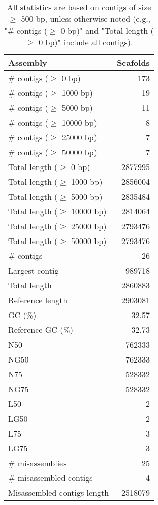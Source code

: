 \documentclass[12pt,a4paper]{article}
\begin{document}
\begin{table}[ht]
\begin{center}
\caption{All statistics are based on contigs of size $\geq$ 500 bp, unless otherwise noted (e.g., "\# contigs ($\geq$ 0 bp)" and "Total length ($\geq$ 0 bp)" include all contigs).}
\begin{tabular}{|l*{1}{|r}|}
\hline
Assembly & Scafolds \\ \hline
\# contigs ($\geq$ 0 bp) & 173 \\ \hline
\# contigs ($\geq$ 1000 bp) & 19 \\ \hline
\# contigs ($\geq$ 5000 bp) & 11 \\ \hline
\# contigs ($\geq$ 10000 bp) & 8 \\ \hline
\# contigs ($\geq$ 25000 bp) & 7 \\ \hline
\# contigs ($\geq$ 50000 bp) & 7 \\ \hline
Total length ($\geq$ 0 bp) & 2877995 \\ \hline
Total length ($\geq$ 1000 bp) & 2856004 \\ \hline
Total length ($\geq$ 5000 bp) & 2835484 \\ \hline
Total length ($\geq$ 10000 bp) & 2814064 \\ \hline
Total length ($\geq$ 25000 bp) & 2793476 \\ \hline
Total length ($\geq$ 50000 bp) & 2793476 \\ \hline
\# contigs & 26 \\ \hline
Largest contig & 989718 \\ \hline
Total length & 2860883 \\ \hline
Reference length & 2903081 \\ \hline
GC (\%) & 32.57 \\ \hline
Reference GC (\%) & 32.73 \\ \hline
N50 & 762333 \\ \hline
NG50 & 762333 \\ \hline
N75 & 528332 \\ \hline
NG75 & 528332 \\ \hline
L50 & 2 \\ \hline
LG50 & 2 \\ \hline
L75 & 3 \\ \hline
LG75 & 3 \\ \hline
\# misassemblies & 25 \\ \hline
\# misassembled contigs & 4 \\ \hline
Misassembled contigs length & 2518079 \\ \hline

\end{tabular}
\end{center}
\end{table}
\end{document}

